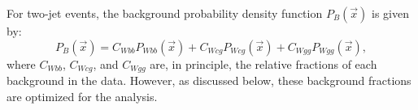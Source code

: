 %
%
%

For two-jet events, the background probability density function
$P_B(\vec{x})$ is given by:
\begin{equation}
P_{B}(\vec{x})= C_{Wbb}P_{Wbb}(\vec{x})
              + C_{Wcg}P_{Wcg}(\vec{x})
              + C_{Wgg}P_{Wgg}(\vec{x}),
\label{probb}
\end{equation}
\noindent where $C_{Wbb}$, $C_{Wcg}$, and $C_{Wgg}$ are, in
principle, the relative fractions of each background in the
data. However, as discussed below, these background fractions are
optimized for the analysis.

